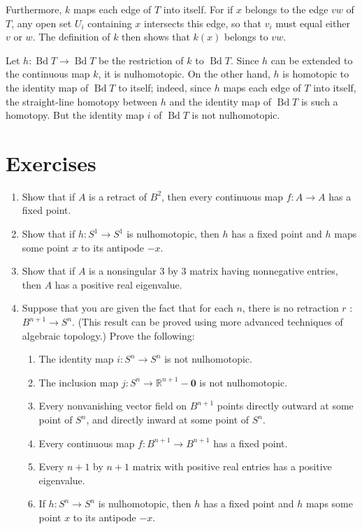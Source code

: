 Furthermore, \(k\) maps each edge of \(T\) into itself. For if \(x\) belongs to the edge \({vw}\) of \(T\), any open set \(U_{i}\) containing \(x\) intersects this edge, so that \(v_{i}\) must equal either \(v\) or \(w\). The definition of \(k\) then shows that \(k(x)\) belongs to \({vw}\).

Let \(h : \operatorname{Bd}T \rightarrow \operatorname{Bd}T\) be the restriction of \(k\) to \(\operatorname{Bd}T\). Since \(h\) can be extended to the continuous map \(k\), it is nulhomotopic. On the other hand, \(h\) is homotopic to the identity map of \(\operatorname{Bd}T\) to itself; indeed, since \(h\) maps each edge of \(T\) into itself, the straight-line homotopy between \(h\) and the identity map of \(\operatorname{Bd}T\) is such a homotopy. But the identity map \(i\) of \(\operatorname{Bd}T\) is not nulhomotopic.

\section*{Exercises}
\begin{enumerate}[itemsep=0.4em, parsep=0pt, topsep=0pt, partopsep=0pt, leftmargin=*, label=\arabic*., ref=\arabic*]
\item Show that if \(A\) is a retract of \(B^{2}\), then every continuous map \(f : A \rightarrow A\) has a fixed point.
\item Show that if \(h : S^{1} \rightarrow {S}^{1}\) is nulhomotopic, then \(h\) has a fixed point and \(h\) maps some point \(x\) to its antipode \(- x\).
\item Show that if \(A\) is a nonsingular 3 by 3 matrix having nonnegative entries, then \(A\) has a positive real eigenvalue.
\item Suppose that you are given the fact that for each \(n\), there is no retraction \(r\) : \(B^{n + 1} \rightarrow {S}^{n}\). (This result can be proved using more advanced techniques of algebraic topology.) Prove the following:
 \begin{enumerate}[itemsep=0.2em, parsep=0pt, topsep=0pt, partopsep=0pt, leftmargin=*, label=(\alph*), align=left]
 \item The identity map \(i : S^{n} \rightarrow {S}^{n}\) is not nulhomotopic.
 \item The inclusion map \(j : S^{n} \rightarrow {\mathbb{R}}^{n + 1} - \mathbf{0}\) is not nulhomotopic.
 \item Every nonvanishing vector field on \(B^{n + 1}\) points directly outward at some point of \(S^{n}\), and directly inward at some point of \(S^{n}\).
 \item Every continuous map \(f : B^{n + 1} \rightarrow {B}^{n + 1}\) has a fixed point.
 \item Every \(n + 1\) by \(n + 1\) matrix with positive real entries has a positive eigenvalue.
 \item If \(h : S^{n} \rightarrow {S}^{n}\) is nulhomotopic, then \(h\) has a fixed point and \(h\) maps some point \(x\) to its antipode \(- x\).
 \end{enumerate}
\end{enumerate}

